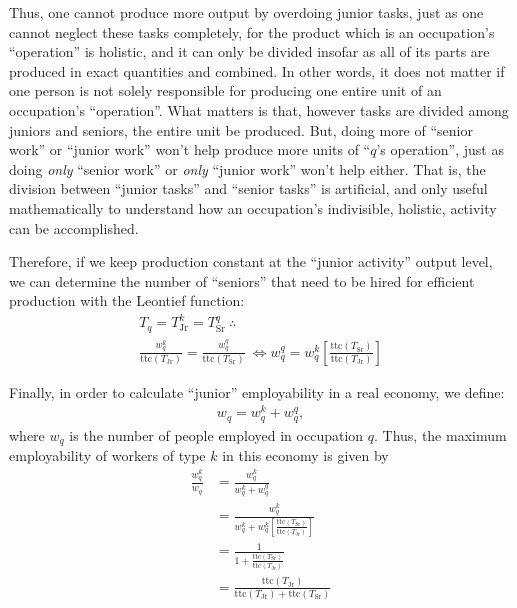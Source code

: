 \documentclass{elsarticle} %
\begin{document}
Thus, one cannot produce more output by overdoing junior tasks, just as one cannot neglect these tasks completely, for the product which is an occupation's ``operation'' is holistic, and it can only be divided insofar as all of its parts are produced in exact quantities and combined. In other words, it does not matter if one person is not solely responsible for producing one entire unit of an occupation's ``operation''. What matters is that, however tasks are divided among juniors and seniors, the entire unit be produced. But, doing more of ``senior work'' or ``junior work'' won't help produce more units of ``$q$'s operation'', just as doing \textit{only} ``senior work'' or \textit{only} ``junior work'' won't help either. That is, the division between ``junior tasks'' and ``senior tasks'' is artificial, and only useful mathematically to understand how an occupation's indivisible, holistic, activity can be accomplished.  

Therefore, if we keep production constant at the ``junior activity'' output level, we can determine the number of ``seniors'' that need to be hired for efficient production  with the Leontief function:
\begin{gather*}
    T_q = T_{\text{Jr}}^{k} = T_{\text{Sr}}^{q}
    \ \therefore \\
    \frac{w_{q}^{k}}{\text{ttc}(T_{\text{Jr}})} = 
    \frac{w_{q}^{q}}{\text{ttc}(T_{\text{Sr}})}
    \ \iff
    w_{q}^{q} = 
    w_{q}^{k}
    \left[
        \frac{
            \text{ttc}(T_{\text{Sr}})
        }{
            \text{ttc}(T_{\text{Jr}})
        }
    \right]
\end{gather*}

Finally, in order to calculate ``junior'' employability in a real economy, we define:
\begin{gather*}
    w_{q} = 
    w_{q}^{k} +
    w_{q}^{q} 
    ,
\end{gather*}
where $w_{q}$ is the number of people employed in occupation $q$. Thus, the maximum employability of workers of type $k$ in this economy is given by
\begin{align*}
    \frac{
        w_{q}^{k}
    }{
        w_{q}
    }
    & =
    \frac{
        w_{q}^{k}
    }{
        w_{q}^{k} + w_{q}^{q}
    }
    \\
    & =
    \frac{
        w_{q}^{k}
    }{
        w_{q}^{k} + 
        w_{q}^{k}
    \left[
        \frac{
            \text{ttc}(T_{\text{Sr}})
        }{
            \text{ttc}(T_{\text{Jr}})
        }
    \right]
    }
    \\
    & =
    \frac{
        1
    }{
        1 + 
        \frac{
            \text{ttc}(T_{\text{Sr}})
        }{
            \text{ttc}(T_{\text{Jr}})
        }
    }
    \\
    & =
    \frac{
        \text{ttc}(T_{\text{Jr}})
    }{
        \text{ttc}(T_{\text{Jr}}) + 
        \text{ttc}(T_{\text{Sr}})
    }
\end{align*}
\end{document}
